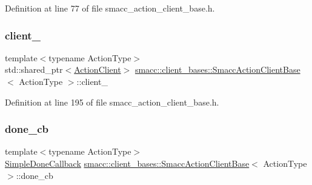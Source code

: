 Definition at line 77 of file smacc\+\_\+action\+\_\+client\+\_\+base.\+h.

\mbox{\label{classsmacc_1_1client__bases_1_1SmaccActionClientBase_ac0c1dd56420ecb53cf0c90cd8bef1b4c}} 
\subsubsection{\texorpdfstring{client\+\_\+}{client\_}}
{\footnotesize\ttfamily template$<$typename Action\+Type$>$ \\
std\+::shared\+\_\+ptr$<$\hyperlink{classsmacc_1_1client__bases_1_1SmaccActionClientBase_ab4cb0717885b95d577f82f4133db7f5f}{Action\+Client}$>$ \hyperlink{classsmacc_1_1client__bases_1_1SmaccActionClientBase}{smacc\+::client\+\_\+bases\+::\+Smacc\+Action\+Client\+Base}$<$ Action\+Type $>$\+::client\+\_\+\hspace{0.3cm}{\ttfamily [protected]}}



Definition at line 195 of file smacc\+\_\+action\+\_\+client\+\_\+base.\+h.

\mbox{\label{classsmacc_1_1client__bases_1_1SmaccActionClientBase_a39fc5030e98f1e30e9919a9d9737b78a}} 
\subsubsection{\texorpdfstring{done\+\_\+cb}{done\_cb}}
{\footnotesize\ttfamily template$<$typename Action\+Type$>$ \\
\hyperlink{classsmacc_1_1client__bases_1_1SmaccActionClientBase_a56eb842a85c65248fda43909b1aaeac1}{Simple\+Done\+Callback} \hyperlink{classsmacc_1_1client__bases_1_1SmaccActionClientBase}{smacc\+::client\+\_\+bases\+::\+Smacc\+Action\+Client\+Base}$<$ Action\+Type $>$\+::done\+\_\+cb}



